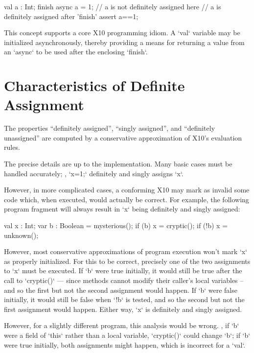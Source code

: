 \begin{ex}
\begin{xten}
val a : Int;
finish {
  async {
    a = 1;
  } 
  // a is not definitely assigned here
}
// a is definitely assigned after 'finish'
assert a==1; 
\end{xten}
\end{ex}

This concept supports a core X10 programming idiom.  A \xcd`val` variable may
be initialized asynchronously, thereby providing a means for returning a value
from an \xcd`async` to be used after the enclosing \xcd`finish`.  

\section{Characteristics of Definite Assignment}

The properties ``definitely assigned'', ``singly assigned'', and
``definitely unassigned'' are computed by a conservative approximation of
X10's evaluation rules.

The precise details are up to the implementation. 
Many basic cases must be handled accurately; \eg, \xcd`x=1;` definitely and
singly assigns \xcd`x`.  

However, in more complicated cases, a conforming X10 may mark as invalid 
some code which, when executed, would actually be correct.  
For example, the following
program fragment will always result in \xcd`x` being definitely and singly
assigned:  
\begin{xten}
val x : Int;
var b : Boolean = mysterious();
if (b) {
   x = cryptic();
}
if (!b) { 
   x = unknown();
}
\end{xten}
However, most conservative approximations of program execution won't mark
\xcd`x` as properly initialized. For this to be correct, precisely one of the
two assignments to \xcd`x` must be executed. If \xcd`b` were true initially,
it would still be true after the call to \xcd`cryptic()` --- since methods
cannot modify their caller's local variables -- and so the first but not the
second assignment would happen. If \xcd`b` were false initially, it would
still be false when \xcd`!b` is tested, and so the second but not the first
assignment would happen.  Either way, \xcd`x` is definitely and singly assigned.

However, for a slightly different program, this analysis would be wrong. \Eg,
if  \xcd`b` were a field of \xcd`this` rather than a local variable,
\xcd`cryptic()` could change \xcd`b`; if \xcd`b` were true initially, both
assignments might happen, which is incorrect for a \xcd`val`.  

